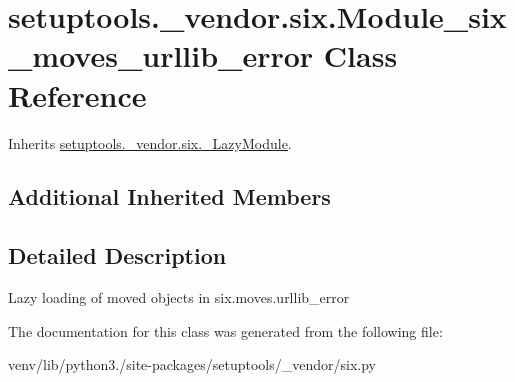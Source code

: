 \hypertarget{classsetuptools_1_1__vendor_1_1six_1_1_module__six__moves__urllib__error}{}\section{setuptools.\+\_\+vendor.\+six.\+Module\+\_\+six\+\_\+moves\+\_\+urllib\+\_\+error Class Reference}
\label{classsetuptools_1_1__vendor_1_1six_1_1_module__six__moves__urllib__error}


Inherits \hyperlink{classsetuptools_1_1__vendor_1_1six_1_1___lazy_module}{setuptools.\+\_\+vendor.\+six.\+\_\+\+Lazy\+Module}.

\subsection*{Additional Inherited Members}


\subsection{Detailed Description}
\begin{DoxyVerb}Lazy loading of moved objects in six.moves.urllib_error\end{DoxyVerb}
 

The documentation for this class was generated from the following file\+:\begin{DoxyCompactItemize}
\item 
venv/lib/python3./site-\/packages/setuptools/\+\_\+vendor/six.\+py\end{DoxyCompactItemize}
